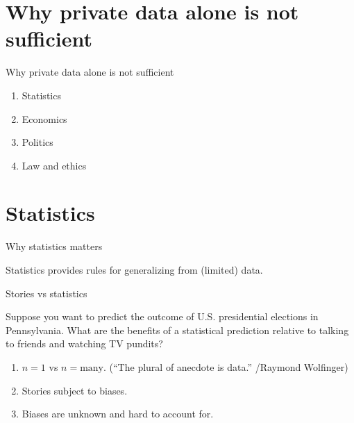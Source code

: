 \documentclass[ignorenonframetext,aspectratio=54,]{beamer}
\providecommand{\tightlist}{%
  \setlength{\itemsep}{0pt}\setlength{\parskip}{0pt}}
\begin{document}
\hypertarget{why-private-data-alone-is-not-sufficient}{%
\section{Why private data alone is not
sufficient}\label{why-private-data-alone-is-not-sufficient}}

\begin{frame}{Why private data alone is not sufficient}
\protect\hypertarget{why-private-data-alone-is-not-sufficient-1}{}

\begin{enumerate}
\tightlist
\item
  Statistics
\item
  Economics
\item
  Politics
\item
  Law and ethics
\end{enumerate}

\end{frame}

\hypertarget{statistics}{%
\section{Statistics}\label{statistics}}

\begin{frame}{Why statistics matters}
\protect\hypertarget{why-statistics-matters}{}

Statistics provides rules for generalizing from (limited) data.

\end{frame}

\begin{frame}{Stories vs statistics}
\protect\hypertarget{stories-vs-statistics}{}

Suppose you want to predict the outcome of U.S. presidential elections
in Pennsylvania. What are the benefits of a statistical prediction
relative to talking to friends and watching TV pundits?

\begin{enumerate}
\tightlist
\item
  \(n=1\) vs \(n=\text{many}\). (``The plural of anecdote is data.''
  /Raymond Wolfinger)
\item
  Stories subject to biases.
\item
  Biases are unknown and hard to account for.
\end{enumerate}

\end{frame}
\end{document}

